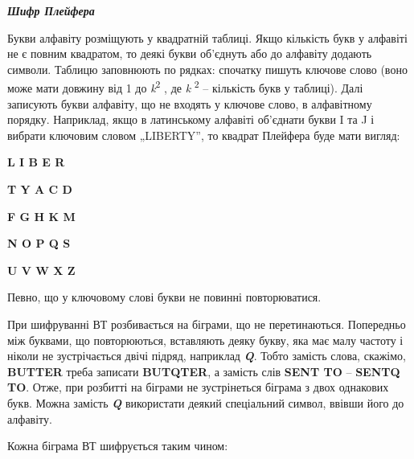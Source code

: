 \documentclass[a4paper]{article}
\newcounter{}
\begin{document}
\bigskip

{\centering\bfseries\itshape
Шифр Плейфера
\par}


\bigskip


\bigskip

Букви алфавіту розміщують у квадратній таблиці. Якщо кількість букв у алфавіті
не є повним квадратом, то деякі букви об’єднуть або до алфавіту додають
символи. Таблицю заповнюють по рядках: спочатку пишуть ключове слово (воно може
мати довжину від 1 до \textit{k}\textsuperscript{2} , де
\textit{k}\textsuperscript{ 2} – кількість букв у таблиці). Далі записують
букви алфавіту, що не входять у ключове слово, в алфавітному порядку.
Наприклад, якщо в латинському алфавіті об’єднати букви I та J і вибрати
ключовим словом „LIBERTY”, то квадрат Плейфера буде мати вигляд:


\bigskip

{\centering\bfseries
L  I  B  E  R
\par}

{\centering\bfseries
T  Y  A  C  D
\par}

{\centering\bfseries
F  G  H  K  M
\par}

{\centering\bfseries
N  O  P  Q  S
\par}

{\centering\bfseries
U  V  W  X  Z
\par}


\bigskip


\bigskip

Певно, що у ключовому слові букви не повинні повторюватися.

При шифруванні ВТ розбивається на біграми, що не перетинаються. Попередньо між
буквами, що повторюються, вставляють деяку букву, яка має малу частоту і ніколи
не зустрічається двічі підряд, наприклад \textbf{\textit{Q}}. Тобто замість
слова, скажімо, \textbf{BUTTER} треба записати \textbf{BUTQTER}, а замість слів
\textbf{SENT TO}  – \textbf{SENTQ TO}. Отже, при розбитті на біграми не
зустрінеться біграма з двох однакових букв. Можна замість \textbf{\textit{Q
}}використати деякий спеціальний символ, ввівши його до алфавіту.

Кожна біграма ВТ шифрується таким чином:
\end{document}
